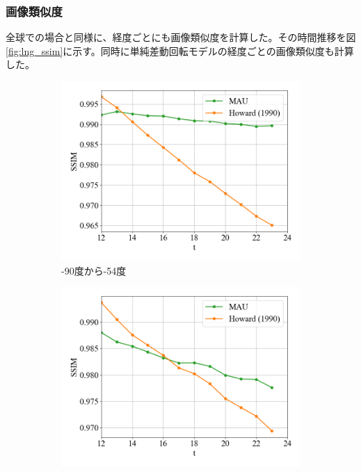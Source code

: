         \subsubsection{画像類似度}
          全球での場合と同様に、経度ごとにも画像類似度を計算した。その時間推移を図\ref{fig:lng_ssim}に示す。同時に単純差動回転モデルの経度ごとの画像類似度も計算した。
          \begin{figure}[htbp]
            \begin{subfigure}{0.55\textwidth}
              \centering
              \includegraphics[width=\textwidth]{figures/exp1/lng_ssim_1.png}
              \caption{-90度から-54度}
            \end{subfigure}
            \begin{subfigure}{0.5\textwidth}
              \centering
              \includegraphics[width=\textwidth]{figures/exp1/lng_ssim_2.png}

\end{subfigure}
\end{figure}
